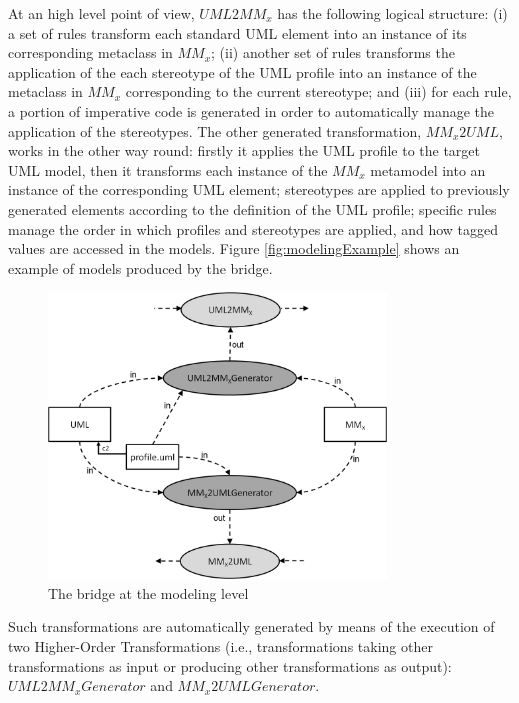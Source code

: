 At an high level point of view, $UML2MM_x$ has the following logical structure: (i) a set of rules transform each standard UML element into an instance of its corresponding metaclass in $MM_x$; (ii) another set of rules transforms the application of the each stereotype of the UML profile into an instance of the metaclass in $MM_x$ corresponding to the current stereotype; and (iii) for each rule, a portion of imperative code is generated in order to automatically manage the application of the stereotypes.
The other generated transformation, $MM_x2UML$, works in the other way round: firstly it applies the UML profile to the target UML model, then it transforms each instance of the $MM_x$ metamodel into an instance of the corresponding UML element; stereotypes are applied to  previously generated elements according to the definition of the UML profile; specific rules manage the order in which profiles and stereotypes are applied, and how tagged values are accessed in the models. Figure \ref{fig:modelingExample} shows an example of models produced by the bridge. 

\begin{figure}[htbp]
	\centering
	\includegraphics[width=0.80\textwidth]{figures/modelingLevel.png}
	\caption{The bridge at the modeling level}
	\label{fig:modelingLevel}
\end{figure}
%
Such transformations are automatically generated by means of the execution of two Higher-Order Transformations
(i.e., transformations taking other transformations as input or producing
other transformations as output): $UML2MM_xGenerator$ and $MM_x2UMLGenerator$.


